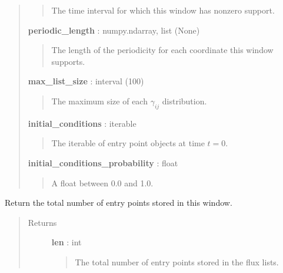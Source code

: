 \documentclass[letterpaper,10pt,english]{sphinxmanual}
\begin{document}
\begin{fulllineitems}
\begin{fulllineitems}
\begin{quote}
\begin{description}
\begin{quote}
The time interval for which this window has nonzero support.
\end{quote}

\textbf{periodic\_length} : numpy.ndarray, list (None)
\begin{quote}

The length of the periodicity for each coordinate this window supports.
\end{quote}

\textbf{max\_list\_size} : interval (100)
\begin{quote}

The maximum size of each \(\gamma_{ij}\) distribution.
\end{quote}

\textbf{initial\_conditions} : iterable
\begin{quote}

The iterable of entry point objects at time \(t=0\).
\end{quote}

\textbf{initial\_conditions\_probability} : float
\begin{quote}

A float between 0.0 and 1.0.
\end{quote}

\end{description}\end{quote}

\end{fulllineitems}


\begin{fulllineitems}
\label{neus/neus.doc:neus.window.Window.__len__}
Return the total number of entry points stored in this window.
\begin{quote}\begin{description}
\item[{Returns}] \leavevmode
\textbf{len} : int
\begin{quote}

The total number of entry points stored in the flux lists.
\end{quote}

\end{description}\end{quote}

\end{fulllineitems}



\end{fulllineitems}
\end{document}
